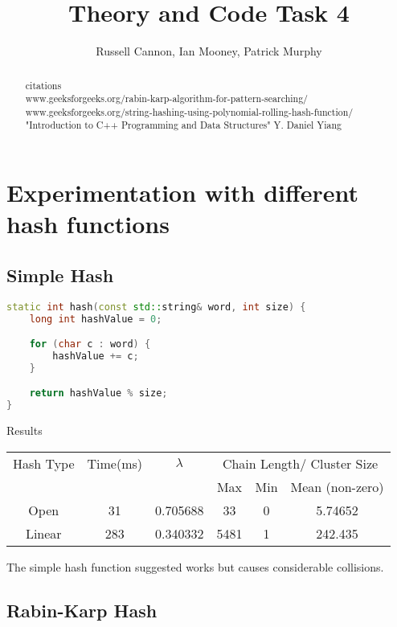 \documentclass[12pt]{article}
\begin{document}
\title{Theory and Code Task 4}
\author{Russell Cannon, Ian Mooney, Patrick Murphy}

\maketitle
\singlespacing

\begin{abstract}
\begin{center}
citations\\
www.geeksforgeeks.org/rabin-karp-algorithm-for-pattern-searching/
www.geeksforgeeks.org/string-hashing-using-polynomial-rolling-hash-function/
"Introduction to C++ Programming and Data Structures" Y. Daniel Yiang
\end{center}
\end{abstract}

\newpage

\section{Experimentation with different hash functions}
\subsection{Simple Hash}
\begin{lstlisting}[language=C++]
static int hash(const std::string& word, int size) {
    long int hashValue = 0;

    for (char c : word) {
        hashValue += c;
    }

    return hashValue % size;
}
\end{lstlisting}

\begin{center}
Results\\
\begin{tabular}{|c|c|c|c|c|c|}
\hline
Hash Type & Time(ms) & $\lambda$ & \multicolumn{3}{|c|}{Chain Length/ Cluster Size} \\
 & & & Max & Min & Mean (non-zero) \\
\hline
Open & 31 & 0.705688 & 33 & 0 & 5.74652\\
Linear & 283 & 0.340332 & 5481 & 1 & 242.435\\
\hline
\end{tabular}
\end{center}

The simple hash function suggested works but causes considerable collisions.

\subsection{Rabin-Karp Hash}
\end{document}
